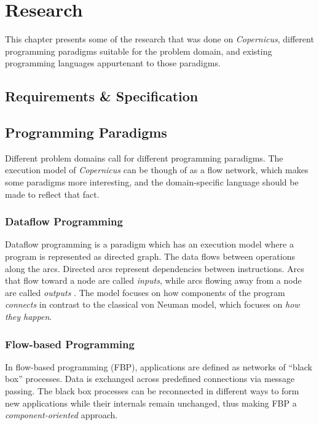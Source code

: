 \chapter{Research}\label{chap:research}
This chapter presents some of the research that was done on
\emph{Copernicus}, different programming paradigms suitable for the
problem domain, and existing programming languages appurtenant to
those paradigms.



\section{Requirements \& Specification}


\section{Programming Paradigms}
Different problem domains call for different programming
paradigms. The execution model of \emph{Copernicus} can be though of
as a flow network, which makes some paradigms more interesting, and
the domain-specific language should be made to reflect that fact.


\subsection{Dataflow Programming}
Dataflow programming is a paradigm which has an execution model where
a program is represented as directed graph. The data flows between
operations along the arcs. Directed arcs represent dependencies
between instructions. Arcs that flow toward a node are called
\emph{inputs}, while arcs flowing away from a node are called
\emph{outputs} \citep{johnston:2004}. The model focuses on how
components of the program \emph{connects} in contrast to the classical
von Neuman model, which focuses on \emph{how they happen}.


\subsection{Flow-based Programming}
In flow-based programming (FBP), applications are defined as networks
of ``black box'' processes. Data is exchanged across predefined
connections via message passing. The black box processes can be
reconnected in different ways to form new applications while their
internals remain unchanged, thus making FBP a
\emph{component-oriented} approach.


